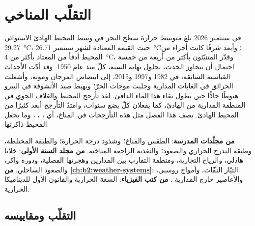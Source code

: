 \chapter{التقلّب المناخي}\label{ch:b2:climate-variability}

في سبتمبر 2026 بلغ متوسط حرارة سطح البحر في وسط المحيط الهادئ الاستوائي \qty{29.27}{\celsius}،
حيث القيمة المعتادة لشهر سبتمبر \qty{26.71}{\celsius}؛ وأبعد شرقًا كانت أجزاء من المحيط
أدفأ من المعتاد بأكثر من \qty{4}{\celsius}، وقدّر المتنبّئون بأكثر من أربعة من خمسة
احتمال أن يتجاوز الحدث، بحلول نهاية السنة، كلّ  منذ عام 1950. وقد أدّت
الأحداث القياسية السابقة، في 1982 و1997 و2015، إلى ابيضاض المرجان وموته، وأشعلت الحرائق في الغابات المدارية
وجلبت موجات الحرّ؛ ويهبط صيد الأنشوفة في البيرو هبوطًا حادًّا حين يطول بقاء هذا الماء الدافئ. لقد
تأرجح المحيط والغلاف الجوي في المنطقة المدارية من الهادئ، كما يفعلان كلّ بضع سنوات، وامتدّ
التأرجح أبعد كثيرًا من المحيط الهادئ. يصف هذا
الفصل مثل هذه التأرجحات في المناخ، أي ،  ، ، وما يجعل المحيط ذاكرتها.

\begin{recall}
\textbf{من مجلّدات المدرسة}: الطقس والمناخ؛ وشذوذ درجة الحرارة؛ والطبقة المختلطة،
وطبقة التدرج الحراري والصعود؛ والتغذية الراجعة المناخية. \textbf{من مجلد السنة الأولى}: خلايا
هادلي، والرياح التجارية، ومنطقة التقارب بين المدارين وهجرتها الفصلية، ودورة
واكر، والصعود الساحلي. \textbf{من \cref{ch:b2:weather-systems}}: التيّار النفّاث،
وأمواج روسبي، والأعاصير خارج المدارية . \textbf{من كتب الفيزياء}: السعة الحرارية
والقانون الأول للديناميكا الحرارية.
\end{recall}

\section{التقلّب ومقاييسه}\label{sec:b2:climate-variability:measures}

